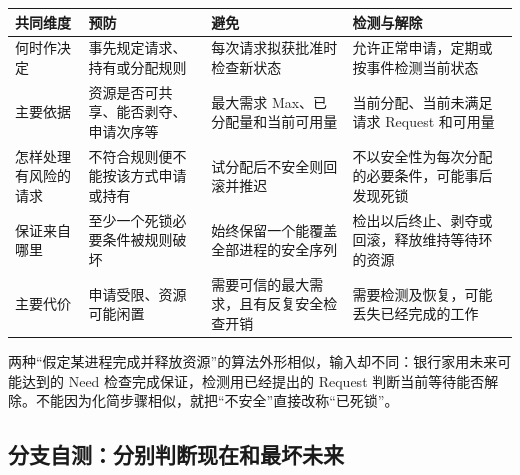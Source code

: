 \begin{wideblock}

\par\medskip\noindent\begin{minipage}{\linewidth}\fontsize{9.3}{12}\selectfont\begin{tabularx}{\linewidth}{@{}YYYY@{}}
\toprule\noalign{}
\begin{minipage}[b]{\linewidth}\raggedright
共同维度
\end{minipage} & \begin{minipage}[b]{\linewidth}\raggedright
预防
\end{minipage} & \begin{minipage}[b]{\linewidth}\raggedright
避免
\end{minipage} & \begin{minipage}[b]{\linewidth}\raggedright
检测与解除
\end{minipage} \\
\midrule\noalign{}


何时作决定 & 事先规定请求、持有或分配规则 & 每次请求拟获批准时检查新状态 & 允许正常申请，定期或按事件检测当前状态 \\
主要依据 & 资源是否可共享、能否剥夺、申请次序等 & 最大需求 Max、已分配量和当前可用量 & 当前分配、当前未满足请求 Request 和可用量 \\
怎样处理有风险的请求 & 不符合规则便不能按该方式申请或持有 & 试分配后不安全则回滚并推迟 & 不以安全性为每次分配的必要条件，可能事后发现死锁 \\
保证来自哪里 & 至少一个死锁必要条件被规则破坏 & 始终保留一个能覆盖全部进程的安全序列 & 检出以后终止、剥夺或回滚，释放维持等待环的资源 \\
主要代价 & 申请受限、资源可能闲置 & 需要可信的最大需求，且有反复安全检查开销 & 需要检测及恢复，可能丢失已经完成的工作 \\
\bottomrule\end{tabularx}
\end{minipage}\par\medskip

\end{wideblock}

两种``假定某进程完成并释放资源''的算法外形相似，输入却不同：银行家用未来可能达到的 Need 检查完成保证，检测用已经提出的 Request 判断当前等待能否解除。不能因为化简步骤相似，就把``不安全''直接改称``已死锁''。

\subsection{分支自测：分别判断现在和最坏未来}\label{OS02-4-review}

